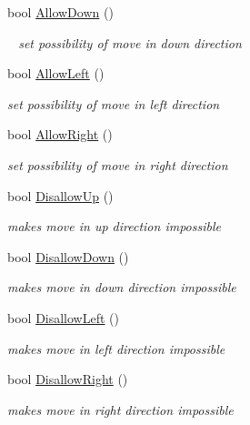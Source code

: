 \begin{DoxyCompactItemize}
\mbox{\label{class_point_a1f334c775c9b49f3bfe9591dc267eb59}} 
bool \mbox{\hyperlink{class_point_a1f334c775c9b49f3bfe9591dc267eb59}{Allow\+Down}} ()
\begin{DoxyCompactList}\small\item\em ~\newline
set possibility of move in down direction \end{DoxyCompactList}\item 
bool \mbox{\hyperlink{class_point_a29eb3406055020f0e40bdf130ea74ee0}{Allow\+Left}} ()
\begin{DoxyCompactList}\small\item\em set possibility of move in left direction \end{DoxyCompactList}\item 
bool \mbox{\hyperlink{class_point_a92545dd0cf053357f70f809bf32a759f}{Allow\+Right}} ()
\begin{DoxyCompactList}\small\item\em set possibility of move in right direction \end{DoxyCompactList}\item 
bool \mbox{\hyperlink{class_point_a61ee1b109f1edf11cfa37b16e9113e9f}{Disallow\+Up}} ()
\begin{DoxyCompactList}\small\item\em makes move in up direction impossible \end{DoxyCompactList}\item 
bool \mbox{\hyperlink{class_point_ab1d92678fc5ba39f65649144a261d6f4}{Disallow\+Down}} ()
\begin{DoxyCompactList}\small\item\em makes move in down direction impossible \end{DoxyCompactList}\item 
bool \mbox{\hyperlink{class_point_a9a3dacc41ce29ba4535b99e9d0c6575e}{Disallow\+Left}} ()
\begin{DoxyCompactList}\small\item\em makes move in left direction impossible \end{DoxyCompactList}\item 
bool \mbox{\hyperlink{class_point_a38a55e9eae750c1e3838c1572b1b8ae2}{Disallow\+Right}} ()
\begin{DoxyCompactList}\small\item\em makes move in right direction impossible \end{DoxyCompactList}\item 

\end{DoxyCompactItemize}
